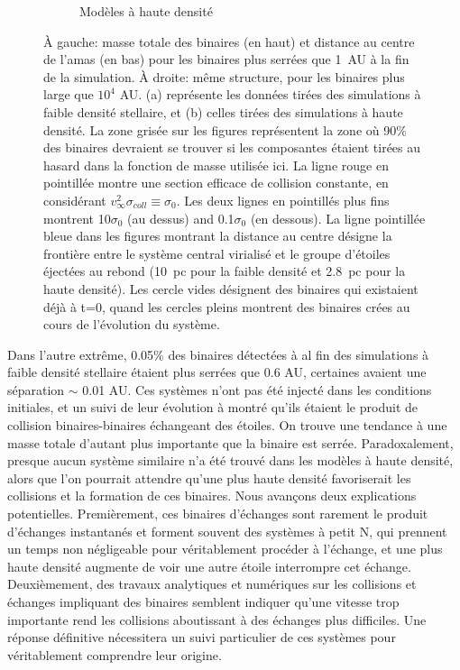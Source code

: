 \begin{figure}
\begin{center}
\begin{subfigure}[b]{0.9\textwidth}
        \caption{Mod\`eles \`a haute densit\'e}
		\label{Fig:6_extreme_HD}	        
    \end{subfigure}
\caption[Extreme tight and wide binaries]
{ \`A gauche: masse totale des binaires (en haut) et distance au centre de l'amas (en bas) pour les binaires plus serr\'ees que 1~AU \`a la fin de la simulation. \`A droite: m\^eme structure, pour les binaires plus large que $10^4$ AU. (a) repr\'esente les donn\'ees tir\'ees des simulations \`a faible densit\'e stellaire, et (b) celles tir\'ees des simulations \`a haute densit\'e. La zone gris\'ee sur les figures repr\'esentent la zone où 90\% des binaires devraient se trouver si les composantes \'etaient tir\'ees au hasard dans la fonction de masse utilis\'ee ici. La ligne rouge en pointill\'ee montre une section efficace de collision constante, en consid\'erant $v^2_\infty \sigma_{coll} \equiv \sigma_0$. Les deux lignes en pointill\'es plus fins montrent 10$\sigma_0$ (au dessus) and 0.1$\sigma_0$ (en dessous). La ligne pointill\'ee bleue dans les figures montrant la distance au centre d\'esigne la fronti\`ere entre le syst\`eme central virialis\'e et le groupe d'\'etoiles \'eject\'ees au rebond (10~pc pour la faible densit\'e et 2.8~pc pour la haute densit\'e). Les cercle vides d\'esignent des binaires qui existaient d\'ej\`a \`a t=0, quand les cercles pleins montrent des binaires cr\'ees au cours de l'\'evolution du syst\`eme.}
\label{Fig:6_extreme}
\end{center}
\end{figure}



Dans l'autre extr\^eme, 0.05\% des binaires d\'etect\'ees \`a al fin des simulations \`a faible densit\'e stellaire \'etaient plus serr\'ees que 0.6 AU, certaines avaient une s\'eparation $\sim$ 0.01 AU. Ces syst\`emes n'ont pas \'et\'e inject\'e dans les conditions initiales, et un suivi de leur \'evolution \`a montr\'e qu'ils \'etaient le produit de collision binaires-binaires \'echangeant des \'etoiles. On trouve une tendance à une masse totale d'autant plus importante que la binaire est serrée. Paradoxalement, presque aucun syst\`eme similaire n'a \'et\'e trouv\'e dans les mod\`eles \`a haute densit\'e, alors que l'on pourrait attendre qu'une plus haute densit\'e favoriserait les collisions et la formation de ces binaires. Nous avan\c{c}ons deux explications potentielles. Premi\`erement, ces binaires d'\'echanges sont rarement le produit d'\'echanges instantan\'es et forment souvent des syst\`emes \`a petit N, qui prennent un temps non n\'egligeable pour v\'eritablement proc\'eder \`a l'\'echange, et une plus haute densit\'e augmente de voir une autre \'etoile interrompre cet \'echange. Deuxi\`emement, des travaux analytiques et num\'eriques sur les collisions et \'echanges impliquant des binaires semblent indiquer qu'une vitesse trop importante rend les collisions aboutissant \`a des \'echanges plus difficiles. Une r\'eponse d\'efinitive n\'ecessitera un suivi particulier de ces syst\`emes pour v\'eritablement comprendre leur origine.

